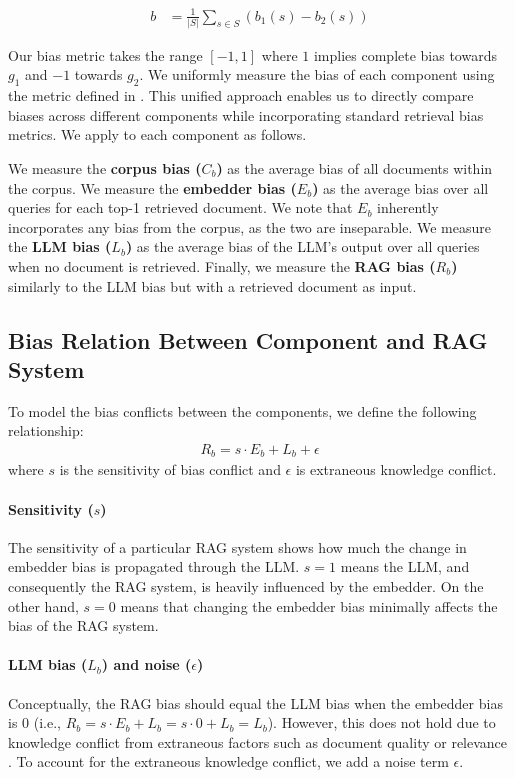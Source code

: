 \begin{align}
\label{eqn:bias-metric}
b &= \frac{1}{|S|}\sum_{s \in S} \left(b_1(s) - b_2(s)\right) 
\end{align}

Our bias metric takes the range $[-1,1]$ where $1$ implies complete bias towards $g_1$ and $-1$ towards $g_2$. We uniformly measure the bias of each component using the metric defined in . This unified approach enables us to directly compare biases across different components while incorporating standard retrieval bias metrics. We apply  to each component as follows.

We measure the \textbf{corpus bias ($C_b$)} as the average bias of all documents within the corpus. We measure the \textbf{embedder bias ($E_b$)} as the average bias over all queries for each top-1 retrieved document. We note that $E_b$ inherently incorporates any bias from the corpus, as the two are inseparable. We measure the \textbf{LLM bias ($L_b$)} as the average bias of the LLM's output over all queries when no document is retrieved. Finally, we measure the \textbf{RAG bias ($R_b$)} similarly to the LLM bias but with a retrieved document as input.

\subsection{Bias Relation Between Component and RAG System}
\label{sec:linear-model}
To model the bias conflicts between the components, we define the following relationship:
\begin{align}
\label{eqn:bias}
R_b = s\cdot E_b + L_b + \epsilon
\end{align}
where $s$ is the sensitivity of bias conflict and $\epsilon$ is extraneous knowledge conflict. 

\paragraph{Sensitivity ($s$)} The sensitivity of a particular RAG system shows how much the change in embedder bias is propagated through the LLM. $s=1$ means the LLM, and consequently the RAG system, is heavily influenced by the embedder. On the other hand, $s=0$ means that changing the embedder bias minimally affects the bias of the RAG system.

\paragraph{LLM bias ($L_b$) and noise ($\epsilon$)} Conceptually, the RAG bias should equal the LLM bias when the embedder bias is 0 (i.e., $R_b=s\cdot E_b + L_b = s\cdot 0 + L_b = L_b$). However, this does not hold due to knowledge conflict from extraneous factors such as document quality or relevance \citep{chen2022rich,xie2023adaptive}. To account for the extraneous knowledge conflict, we add a noise term $\epsilon$.


